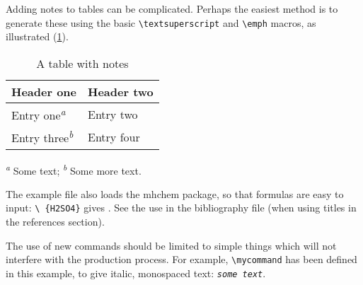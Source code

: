 \documentclass[a4paper]{article}
\newcommand*{\mycommand}[1]{\texttt{\emph{#1}}}
\begin{document}
Adding notes to tables can be complicated.  Perhaps the easiest
method is to generate these using the basic
\texttt{\textbackslash textsuperscript} and
\texttt{\textbackslash emph} macros, as illustrated
(\ref{tbl:notes}).
\begin{table}
  \caption{A table with notes}
  \label{tbl:notes}
  \begin{tabular}{ll}
    \hline
    Header one & Header two \\
    \hline
    Entry one\textsuperscript{\emph{a}}
      & Entry two \\
    Entry three\textsuperscript{\emph{b}}
      & Entry four \\
  \hline
  \end{tabular}

  \textsuperscript{\emph{a}} Some text;
  \textsuperscript{\emph{b}} Some more text.
\end{table}

The example file also loads the \textsf{mhchem} package, so
that formulas are easy to input: \texttt{\textbackslash
\ce\{H2SO4\}} gives .  See the use in the
bibliography file (when using titles in the references
section).

The use of new commands should be limited to simple things which will
not interfere with the production process.  For example,
\texttt{\textbackslash mycommand} has been defined in this example,
to give italic, monospaced text: \mycommand{some text}.



\end{document}
